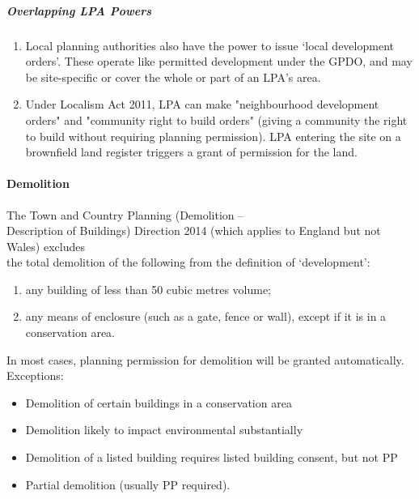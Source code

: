 \documentclass[
]{article}
\providecommand{\tightlist}{%
  \setlength{\itemsep}{0pt}\setlength{\parskip}{0pt}}
\begin{document}
\hypertarget{overlapping-lpa-powers}{%
\subparagraph{Overlapping LPA Powers}\label{overlapping-lpa-powers}}

\begin{enumerate}
\tightlist
\item
  Local planning authorities also have the power to issue `local
  development orders'. These operate like permitted development under
  the GPDO, and may be site-specific or cover the whole or part of an
  LPA's area.
\item
  Under Localism Act 2011, LPA can make "neighbourhood development
  orders" and "community right to build orders" (giving a community the
  right to build without requiring planning permission). LPA entering
  the site on a brownfield land register triggers a grant of permission
  for the land.
\end{enumerate}

\hypertarget{demolition}{%
\paragraph{Demolition}\label{demolition}}

The Town and Country Planning (Demolition --\\
Description of Buildings) Direction 2014 (which applies to England but
not Wales) excludes\\
the total demolition of the following from the definition of
`development':

\begin{enumerate}
\tightlist
\item
  any building of less than 50 cubic metres volume;
\item
  any means of enclosure (such as a gate, fence or wall), except if it
  is in a conservation area.
\end{enumerate}

In most cases, planning permission for demolition will be granted
automatically. Exceptions:

\begin{itemize}
\tightlist
\item
  Demolition of certain buildings in a conservation area
\item
  Demolition likely to impact environmental substantially
\item
  Demolition of a listed building requires listed building consent, but
  not PP
\item
  Partial demolition (usually PP required).
\end{itemize}
\end{document}
